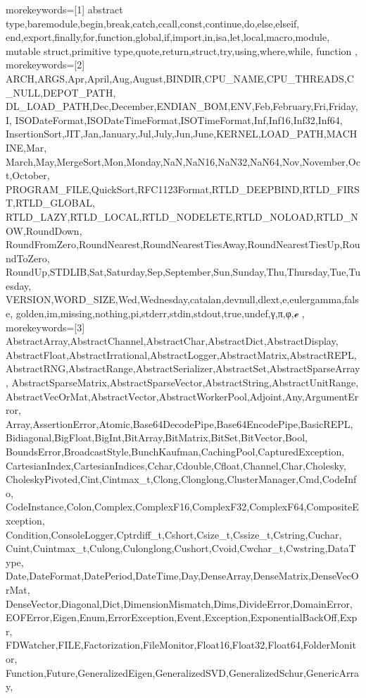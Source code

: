 {%
%
%
morekeywords=[1]
{%
abstract type,baremodule,begin,break,catch,ccall,const,continue,do,else,elseif,%
end,export,finally,for,function,global,if,import,in,isa,let,local,macro,module,%
mutable struct,primitive type,quote,return,struct,try,using,where,while, function%
},%
%
%
morekeywords=[2]
{%
ARCH,ARGS,Apr,April,Aug,August,BINDIR,CPU_NAME,CPU_THREADS,C_NULL,DEPOT_PATH,%
DL_LOAD_PATH,Dec,December,ENDIAN_BOM,ENV,Feb,February,Fri,Friday,I,%
ISODateFormat,ISODateTimeFormat,ISOTimeFormat,Inf,Inf16,Inf32,Inf64,%
InsertionSort,JIT,Jan,January,Jul,July,Jun,June,KERNEL,LOAD_PATH,MACHINE,Mar,%
March,May,MergeSort,Mon,Monday,NaN,NaN16,NaN32,NaN64,Nov,November,Oct,October,%
PROGRAM_FILE,QuickSort,RFC1123Format,RTLD_DEEPBIND,RTLD_FIRST,RTLD_GLOBAL,%
RTLD_LAZY,RTLD_LOCAL,RTLD_NODELETE,RTLD_NOLOAD,RTLD_NOW,RoundDown,%
RoundFromZero,RoundNearest,RoundNearestTiesAway,RoundNearestTiesUp,RoundToZero,%
RoundUp,STDLIB,Sat,Saturday,Sep,September,Sun,Sunday,Thu,Thursday,Tue,Tuesday,%
VERSION,WORD_SIZE,Wed,Wednesday,catalan,devnull,dlext,e,eulergamma,false,%
golden,im,missing,nothing,pi,stderr,stdin,stdout,true,undef,γ,π,φ,ℯ%
},%
%
%
morekeywords=[3]
{%
AbstractArray,AbstractChannel,AbstractChar,AbstractDict,AbstractDisplay,%
AbstractFloat,AbstractIrrational,AbstractLogger,AbstractMatrix,AbstractREPL,%
AbstractRNG,AbstractRange,AbstractSerializer,AbstractSet,AbstractSparseArray,%
AbstractSparseMatrix,AbstractSparseVector,AbstractString,AbstractUnitRange,%
AbstractVecOrMat,AbstractVector,AbstractWorkerPool,Adjoint,Any,ArgumentError,%
Array,AssertionError,Atomic,Base64DecodePipe,Base64EncodePipe,BasicREPL,%
Bidiagonal,BigFloat,BigInt,BitArray,BitMatrix,BitSet,BitVector,Bool,%
BoundsError,BroadcastStyle,BunchKaufman,CachingPool,CapturedException,%
CartesianIndex,CartesianIndices,Cchar,Cdouble,Cfloat,Channel,Char,Cholesky,%
CholeskyPivoted,Cint,Cintmax_t,Clong,Clonglong,ClusterManager,Cmd,CodeInfo,%
CodeInstance,Colon,Complex,ComplexF16,ComplexF32,ComplexF64,CompositeException,%
Condition,ConsoleLogger,Cptrdiff_t,Cshort,Csize_t,Cssize_t,Cstring,Cuchar,%
Cuint,Cuintmax_t,Culong,Culonglong,Cushort,Cvoid,Cwchar_t,Cwstring,DataType,%
Date,DateFormat,DatePeriod,DateTime,Day,DenseArray,DenseMatrix,DenseVecOrMat,%
DenseVector,Diagonal,Dict,DimensionMismatch,Dims,DivideError,DomainError,%
EOFError,Eigen,Enum,ErrorException,Event,Exception,ExponentialBackOff,Expr,%
FDWatcher,FILE,Factorization,FileMonitor,Float16,Float32,Float64,FolderMonitor,%
Function,Future,GeneralizedEigen,GeneralizedSVD,GeneralizedSchur,GenericArray,%
}}
